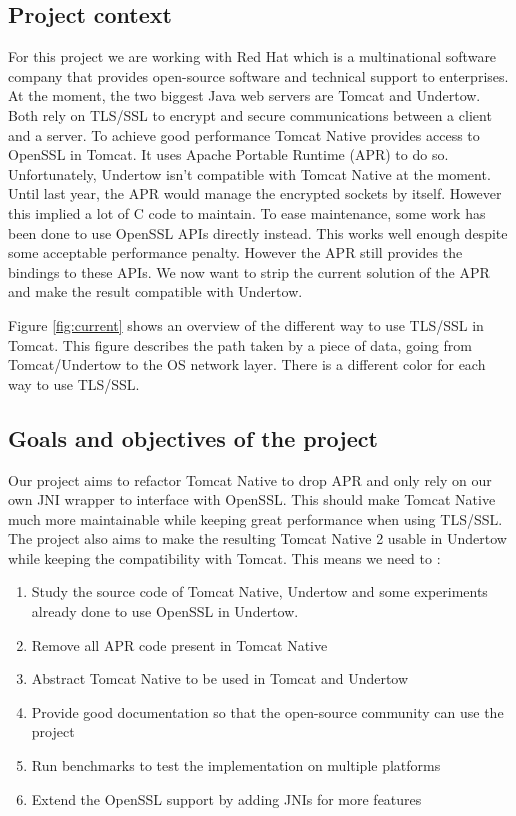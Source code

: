 \documentclass[11pt,a4paper,bibliography=totocnumbered]{scrartcl}
\def\mytitle{Tomcat Native 2}
\def\theclient{Red Hat}
\begin{document}
\subsection{Project context}
For this project we are working with \theclient{} which is a multinational software company that provides open-source software and technical support to enterprises\autocite{redhat}.
At the moment, the two biggest Java web servers are Tomcat\autocite{tomcat} and Undertow\autocite{undertow}. Both rely on TLS/SSL to encrypt and secure communications between a client and a server. To achieve good performance Tomcat Native\autocite{tomcat-native} provides access to OpenSSL in Tomcat. It uses Apache Portable Runtime (APR) to do so. 
Unfortunately, Undertow isn't compatible with Tomcat Native at the moment.
Until last year, the APR would manage the encrypted sockets by itself. However this implied a lot of C code to maintain. To ease maintenance, some work has been done to use OpenSSL APIs directly instead. This works well enough despite some acceptable performance penalty. However the APR still provides the bindings to these APIs.
We now want to strip the current solution of the APR and make the result compatible with Undertow.

Figure \ref{fig:current} shows an overview of the different way to use TLS/SSL in Tomcat. This figure describes the path taken by a piece of data, going from Tomcat/Undertow to the OS network layer. There is a different color for each way to use TLS/SSL.

\subsection{Goals and objectives of the project}

Our project aims to refactor Tomcat Native to drop APR and only rely on our own JNI wrapper to interface with OpenSSL. This should make Tomcat Native much more maintainable while keeping great performance when using TLS/SSL. The project also aims to make the resulting \mytitle{} usable in Undertow while keeping the compatibility with Tomcat.
This means we need to :
\begin{enumerate}
\item Study the source code of Tomcat Native, Undertow and some experiments already done to use OpenSSL in Undertow.
\item Remove all APR code present in Tomcat Native
\item Abstract Tomcat Native to be used in Tomcat and Undertow
\item Provide good documentation so that the open-source community can use the project
\item Run benchmarks to test the implementation on multiple platforms
\item Extend the OpenSSL support by adding JNIs for more features
\end{enumerate}
\end{document}

